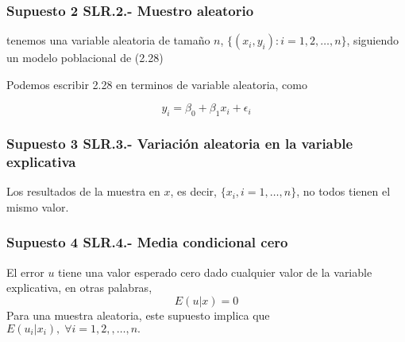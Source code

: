\subsubsection{Supuesto 2 SLR.2.- Muestro aleatorio}
\begin{tcolorbox}[colframe=white]
    tenemos una variable aleatoria de tamaño $n$, $\lbrace(x_i,y_i): i = 1,2,\ldots,n\rbrace$, siguiendo un modelo poblacional de (2.28)
\end{tcolorbox}

Podemos escribir 2.28 en terminos de variable aleatoria, como 
\begin{tcolorbox}[colframe=white]
    \begin{equation}
	y_i = \beta_0 + \beta_1 x_i + \epsilon_i
    \end{equation}
\end{tcolorbox}

\subsubsection{Supuesto 3 SLR.3.- Variación aleatoria en la variable explicativa}
\begin{tcolorbox}[colframe=white]
    Los resultados de la muestra en $x$, es decir, $\lbrace x_i,i=1,\ldots, n\rbrace$, no todos tienen el mismo valor.
\end{tcolorbox}

\subsubsection{Supuesto 4 SLR.4.- Media condicional cero}
\begin{tcolorbox}[colframe=white]
    El error $u$ tiene una valor esperado cero dado cualquier valor de la variable explicativa, en otras palabras,
    $$E(u|x) = 0$$
    Para una muestra aleatoria, este supuesto implica que $E(u_i|x_i), \; \forall i = 1,2,,\ldots,n.$
\end{tcolorbox}

